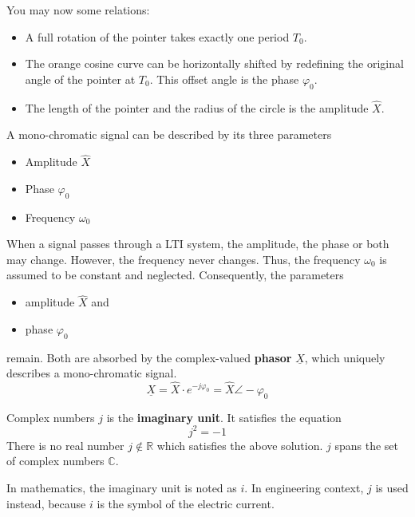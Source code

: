 \begin{refsection}
You may now some relations:
\begin{itemize}
	\item A full rotation of the pointer takes exactly one period $T_0$.
	\item The orange cosine curve can be horizontally shifted by redefining the original angle of the pointer at $T_0$. This offset angle is the phase $\varphi_0$.
	\item The length of the pointer and the radius of the circle is the amplitude $\hat{X}$.
\end{itemize}

A mono-chromatic signal can be described by its three parameters
\begin{itemize}
	\item Amplitude $\hat{X}$
	\item Phase $\varphi_0$
	\item Frequency $\omega_0$
\end{itemize}

When a signal passes through a \ac{LTI} system, the amplitude, the phase or both may change. However, the frequency never changes. Thus, the frequency $\omega_0$ is assumed to be constant and neglected. Consequently, the parameters
\begin{itemize}
	\item amplitude $\hat{X}$ and
	\item phase $\varphi_0$
\end{itemize}
remain. Both are absorbed by the complex-valued  \textbf{phasor} $\underline{X}$, which uniquely describes a mono-chromatic signal.
\begin{equation}
	\underline{X} = \hat{X} \cdot e^{-j \varphi_0} = \hat{X} \angle -\varphi_0
\end{equation}

\begin{excursus}{Complex numbers}
	$j$ is the  \textbf{imaginary unit}. It satisfies the equation
	\begin{equation}
		j^2 = -1
	\end{equation}
	There is no real number $j \notin \mathbb{R}$ which satisfies the above solution. $j$ spans the set of complex numbers $\mathbb{C}$.
	
	In mathematics, the imaginary unit is noted as $i$. In engineering context, $j$ is used instead, because $i$ is the symbol of the electric current.
	

\end{excursus}
\end{refsection}
